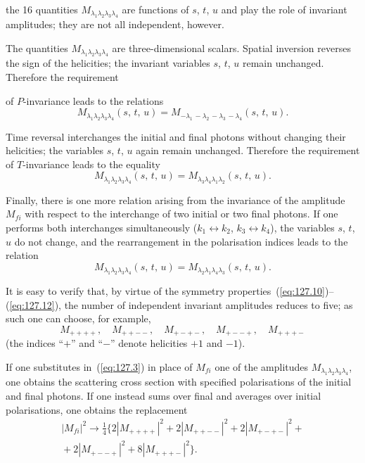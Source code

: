 \noindent the 16 quantities $M_{\lambda_1 \lambda_2 \lambda_3 \lambda_4}$ are functions of $s$, $t$, $u$ and play the role of invariant amplitudes; they are not all independent, however.

The quantities $M_{\lambda_1 \lambda_2 \lambda_3 \lambda_4}$ are three-dimensional scalars. Spatial inversion reverses the sign of the helicities; the invariant variables $s$, $t$, $u$ remain unchanged. Therefore the requirement


\noindent of $P$-invariance leads to the relations
\begin{equation}
M_{\lambda_1 \lambda_2 \lambda_3 \lambda_4}(s,\,t,\,u) = M_{-\lambda_1\,-\lambda_2\,-\lambda_3\,-\lambda_4}(s,\,t,\,u).
\label{eq:127.10}
\end{equation}

Time reversal interchanges the initial and final photons without changing their helicities; the variables $s$, $t$, $u$ again remain unchanged. Therefore the requirement of $T$-invariance leads to the equality
\begin{equation}
M_{\lambda_1 \lambda_2 \lambda_3 \lambda_4}(s,\,t,\,u) = M_{\lambda_3 \lambda_4 \lambda_1 \lambda_2}(s,\,t,\,u).
\label{eq:127.11}
\end{equation}

Finally, there is one more relation arising from the invariance of the amplitude $M_{fi}$ with respect to the interchange of two initial or two final photons. If one performs both interchanges simultaneously ($k_1 \leftrightarrow k_2$, $k_3 \leftrightarrow k_4$), the variables $s$, $t$, $u$ do not change, and the rearrangement in the polarisation indices leads to the relation
\begin{equation}
M_{\lambda_1 \lambda_2 \lambda_3 \lambda_4}(s,\,t,\,u) = M_{\lambda_2 \lambda_1 \lambda_4 \lambda_3}(s,\,t,\,u).
\label{eq:127.12}
\end{equation}

It is easy to verify that, by virtue of the symmetry properties~(\ref{eq:127.10})--(\ref{eq:127.12}), the number of independent invariant amplitudes reduces to five; as such one can choose, for example,
\[
M_{++++},\quad M_{++--},\quad M_{+-+-},\quad M_{+--+},\quad M_{+++-}
\]
(the indices ``$+$'' and ``$-$'' denote helicities $+1$ and $-1$).

If one substitutes in~(\ref{eq:127.3}) in place of $M_{fi}$ one of the amplitudes $M_{\lambda_1 \lambda_2 \lambda_3 \lambda_4}$, one obtains the scattering cross section with specified polarisations of the initial and final photons. If one instead sums over final and averages over initial polarisations, one obtains the replacement
\begin{multline}
|M_{fi}|^2 \to \tfrac{1}{4}\{2|M_{++++}|^2 + 2|M_{++--}|^2 + 2|M_{+-+-}|^2 + {} \\
{} + 2|M_{+--+}|^2 + 8|M_{+++-}|^2\}.
\label{eq:127.13}
\end{multline}

